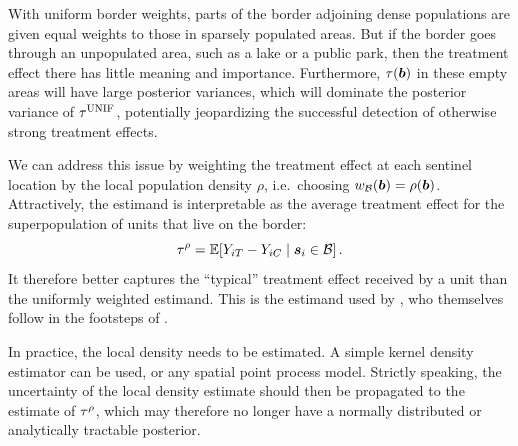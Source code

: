 
With uniform border weights, parts of the border adjoining dense populations are given equal weights to those in sparsely populated areas.
But if the border goes through an unpopulated area, such as a lake or a public park, then the treatment effect there has little meaning and importance.
Furthermore, \(\tau(\bm{b})\) in these empty areas will have large posterior variances, which will dominate the posterior variance of \(\tau^{\mathrm{UNIF}}\), potentially jeopardizing the successful detection of otherwise strong treatment effects.

We can address this issue by weighting the treatment effect at each sentinel location by the local population density \(\rho\),
i.e.\ choosing \(w_{\mathcal{B}}(\bm{b}) = \rho(\bm{b})\).
Attractively, the estimand is interpretable as the average treatment effect for the superpopulation of units that live on the border:
\begin{equation}
    \taurho = \E\sbr{Y_{i\treat} - Y_{i\ctrol} \mid \svec_i \in \border}\,.
\end{equation}
It therefore better captures the ``typical'' treatment effect received by a unit than the uniformly weighted estimand.
This is the estimand used by \cite{keele_titiunik_2015}, who themselves follow in the footsteps of \cite{imbens2011regression}.

In practice, the local density needs to be estimated.
A simple kernel density estimator can be used,
or any spatial point process model.
Strictly speaking, the uncertainty of the local density estimate should then be propagated to the estimate of \(\tau^{\rho}\), which may therefore no longer have a normally distributed or analytically tractable posterior.

